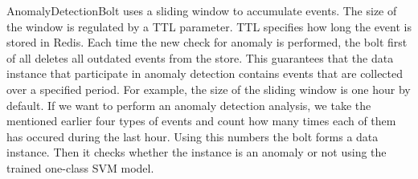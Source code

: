 AnomalyDetectionBolt uses a sliding window to accumulate events.
The size of the window is regulated by a TTL parameter.
TTL specifies how long the event is stored in Redis.
Each time the new check for anomaly is performed, the bolt first of all deletes all outdated events from the store.
This guarantees that the data instance that participate in anomaly detection contains events that are collected over a specified period.
For example, the size of the sliding window is one hour by default.
If we want to perform an anomaly detection analysis, we take the mentioned earlier four types of events and count how many times each of them has occured during the last hour.
Using this numbers the bolt forms a data instance.  
Then it checks whether the instance is an anomaly or not using the trained one-class SVM model.









 	

 
 
